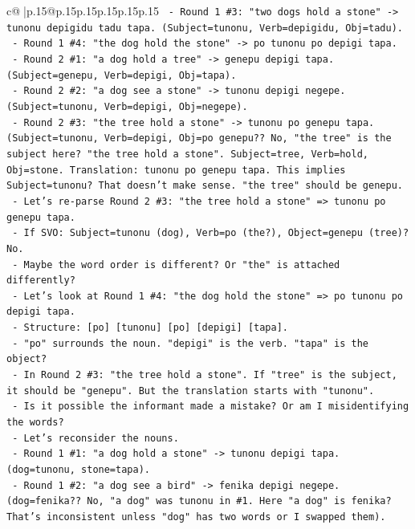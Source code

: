 \documentclass{article}
\begin{document}
{\begin{supertabular}{c@{$\;$}|p{.15\linewidth}@{}p{.15\linewidth}p{.15\linewidth}p{.15\linewidth}p{.15\linewidth}p{.15\linewidth}}
{{{\texttt{    {-} Round 1 \#3: "two dogs hold a stone" {-}> tunonu depigidu tadu tapa. (Subject=tunonu, Verb=depigidu, Obj=tadu).} \\
\texttt{    {-} Round 1 \#4: "the dog hold the stone" {-}> po tunonu po depigi tapa.} \\
\texttt{    {-} Round 2 \#1: "a dog hold a tree" {-}> genepu depigi tapa. (Subject=genepu, Verb=depigi, Obj=tapa).} \\
\texttt{    {-} Round 2 \#2: "a dog see a stone" {-}> tunonu depigi negepe. (Subject=tunonu, Verb=depigi, Obj=negepe).} \\
\texttt{    {-} Round 2 \#3: "the tree hold a stone" {-}> tunonu po genepu tapa. (Subject=tunonu, Verb=depigi, Obj=po genepu?? No, "the tree" is the subject here? "the tree hold a stone". Subject=tree, Verb=hold, Obj=stone. Translation: tunonu po genepu tapa. This implies Subject=tunonu? That doesn't make sense. "the tree" should be genepu.} \\
\texttt{    {-} Let's re{-}parse Round 2 \#3: "the tree hold a stone" => tunonu po genepu tapa.} \\
\texttt{      {-} If SVO: Subject=tunonu (dog), Verb=po (the?), Object=genepu (tree)? No.} \\
\texttt{      {-} Maybe the word order is different? Or "the" is attached differently?} \\
\texttt{      {-} Let's look at Round 1 \#4: "the dog hold the stone" => po tunonu po depigi tapa.} \\
\texttt{        {-} Structure: {[}po{]} {[}tunonu{]} {[}po{]} {[}depigi{]} {[}tapa{]}.} \\
\texttt{        {-} "po" surrounds the noun. "depigi" is the verb. "tapa" is the object?} \\
\texttt{        {-} In Round 2 \#3: "the tree hold a stone". If "tree" is the subject, it should be "genepu". But the translation starts with "tunonu".} \\
\texttt{        {-} Is it possible the informant made a mistake? Or am I misidentifying the words?} \\
\texttt{        {-} Let's reconsider the nouns.} \\
\texttt{          {-} Round 1 \#1: "a dog hold a stone" {-}> tunonu depigi tapa. (dog=tunonu, stone=tapa).} \\
\texttt{          {-} Round 1 \#2: "a dog see a bird" {-}> fenika depigi negepe. (dog=fenika?? No, "a dog" was tunonu in \#1. Here "a dog" is fenika? That's inconsistent unless "dog" has two words or I swapped them).} \\
}}}
\end{supertabular}}
\end{document}
